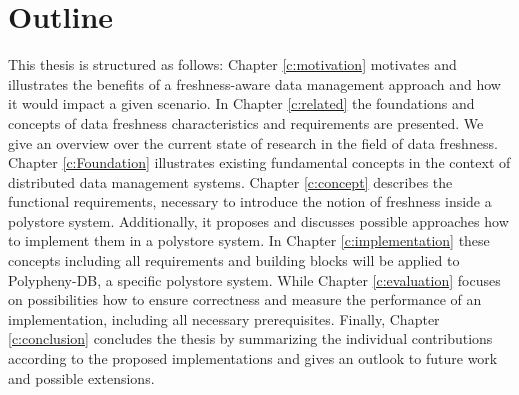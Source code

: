 \section{Outline}
This thesis is structured as follows:
Chapter \ref{c:motivation} motivates and illustrates the benefits of a freshness-aware data management approach and how it would impact a given scenario.
In Chapter \ref{c:related} the foundations and concepts of data freshness characteristics and requirements are presented.
We give an overview over the current state of research in the field of data freshness. 
Chapter \ref{c:Foundation} illustrates existing fundamental concepts in the context of distributed data management systems. 
Chapter \ref{c:concept} describes the functional requirements, necessary to introduce the notion of freshness inside a polystore system. Additionally, 
it proposes and discusses possible approaches how to implement them in a polystore system. 
In Chapter \ref{c:implementation} these concepts including all requirements and building blocks will be applied to Polypheny-DB, a specific polystore system.
While Chapter \ref{c:evaluation} focuses on possibilities how to ensure correctness and measure the performance of an implementation, including all necessary prerequisites.
Finally, Chapter \ref{c:conclusion} concludes the thesis by summarizing the individual contributions according to the proposed
implementations and gives an outlook to future work and possible extensions.


